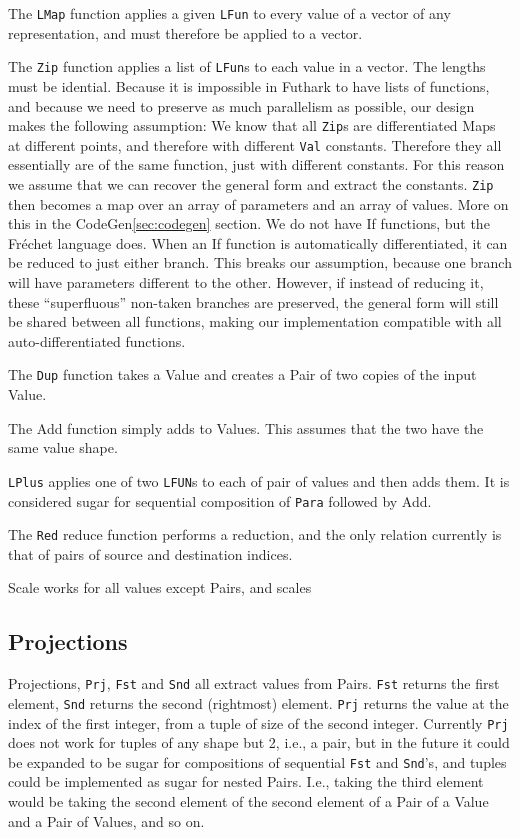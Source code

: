 The \texttt{LMap} function applies a given \texttt{LFun} to every value of a vector of any
representation, and must therefore be applied to a vector.

The \texttt{Zip} function applies a list of \texttt{LFun}s to each value in a
vector. The lengths must be idential. Because it is
impossible in Futhark to have lists of functions, and because we need to
preserve as much parallelism as possible, our design makes the following
assumption: We know that all \texttt{Zip}s are differentiated Maps at different
points, and therefore with different \texttt{Val} constants. Therefore they all
essentially are of the same function, just with different constants. For this
reason we assume that we can recover the general form and extract the constants.
\texttt{Zip} then becomes a map over an array of parameters and an array of
values. More on this in the CodeGen\autoref{sec:codegen} section. We do not have If functions, but the Fréchet
language does. When an If function is automatically differentiated, it can be
reduced to just either branch. This breaks our assumption, because one branch
will have parameters different to the other. However, if instead of reducing it,
these \enquote{superfluous} non-taken branches are preserved, the general form
will still be shared between all functions, making our implementation compatible
with all auto-differentiated functions.

The \texttt{Dup} function takes a Value and creates a Pair of two copies of the input Value.

The Add function simply adds to Values. This assumes that the two have the same value shape.

\texttt{LPlus} applies one of two \texttt{LFUN}s to each of pair of values and
then adds them. It is considered sugar for sequential composition of \texttt{Para}
followed by Add.

The \texttt{Red} reduce function performs a reduction, and the only relation currently
is that of pairs of source and destination indices.

Scale works for all values except Pairs, and scales

\subsection{Projections} Projections, \texttt{Prj}, \texttt{Fst} and
\texttt{Snd} all extract values from Pairs. \texttt{Fst} returns the first
element, \texttt{Snd} returns the second (rightmost) element. \texttt{Prj}
returns the value at the index of the first integer, from a tuple of size of the
second integer. Currently \texttt{Prj} does not work for tuples of any shape but
2, i.e., a pair, but in the future it could be expanded to be sugar for
compositions of sequential \texttt{Fst} and \texttt{Snd}'s, and tuples could be
implemented as sugar for nested Pairs. I.e., taking the third element would be
taking the second element of the second element of a Pair of a Value and a Pair
of Values, and so on.


